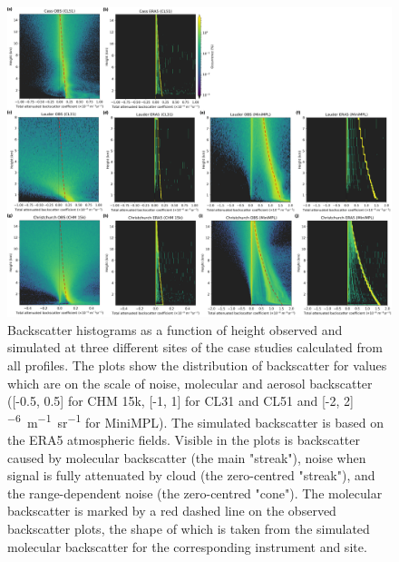 \begin{figure}[t]
\centering
\includegraphics[width=\textwidth]{chapter3/fig/backscatter_hist_micro.png}
\caption[Backscatter histograms as a function of height]{
Backscatter histograms as a function of height observed and simulated
at three different sites of the case studies calculated from all profiles.
The plots show the distribution
of backscatter for values which are on the scale of noise, molecular and
aerosol backscatter ([-0.5, 0.5] for CHM 15k, [-1, 1] for CL31 and CL51 and 
[-2, 2] \unit{^{-6}m^{-1}sr^{-1}} for MiniMPL).
The simulated backscatter is based on the ERA5
atmospheric fields. Visible in the plots is backscatter caused by molecular
backscatter (the main "streak"), noise when signal is fully attenuated by cloud
(the zero-centred "streak"), and the range-dependent noise
(the zero-centred "cone"). The molecular backscatter is marked by a red dashed
line on the observed backscatter plots, the shape of which is taken from
the simulated molecular backscatter for the corresponding instrument and site.
}
\label{fig:micro-backscatter}
\end{figure}


